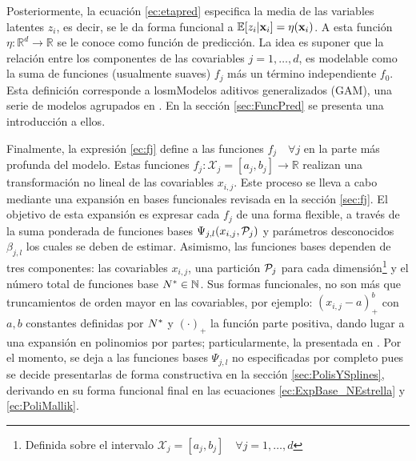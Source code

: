 \documentclass[../Main/Main.tex]{subfiles}
\begin{document}
Posteriormente, la ecuación \eqref{ec:etapred} especifica la media de las variables latentes $z_i$, es decir, se le da forma funcional a $\E[z_i|\xni] = \eta(\xni)$. A esta función $\eta:\mathbb{R}^d\rightarrow\mathbb{R}$ se le conoce como función de predicción. La idea es suponer que la relación entre los componentes de las covariables $j = 1,\ldots,d$, es modelable como la suma de funciones (usualmente suaves) $f_j$ más un término independiente $f_0$. Esta definición corresponde a losmModelos  aditivos generalizados (GAM), una serie de modelos agrupados en \citet{hastie1986generalized}. En la sección \ref{sec:FuncPred} se presenta una introducción a ellos.

Finalmente, la expresión \eqref{ec:fj} define a las funciones $f_j \quad \forall j$ en la parte más profunda del modelo. Estas funciones $f_j: \mathcal{X}_j = [a_j,b_j] \rightarrow \mathbb{R}$ realizan una transformación no lineal de las covariables $x_{i,j}$. Este proceso se lleva a cabo mediante una expansión en bases funcionales revisada en la sección \ref{sec:fj}. El objetivo de esta expansión es expresar cada $f_j$ de una forma flexible, a través de la suma ponderada de funciones bases $\Psi_{j,l}(x_{i,j},\P_j)$ y parámetros desconocidos $\beta_{j,l}$ los cuales se deben de estimar. Asimismo, las funciones bases dependen de tres componentes: las covariables $x_{i,j}$, una partición $\P_j$ para cada dimensión\footnote{Definida sobre el intervalo $\mathcal{X}_j = [a_j, b_j] \quad \forall j = 1,\ldots,d$} y el número total de funciones base $\N\in\mathbb{N}$. Sus formas funcionales, no son más que truncamientos de orden mayor en las covariables, por ejemplo: $(x_{i,j} - a)_+^b$ con $a,b$ constantes definidas por $\N$ y $(\cdot)_+$ la función parte positiva, dando lugar a una expansión en  
polinomios por partes; particularmente, la presentada en \citet{mallik1998automatic}. Por el momento, se deja a las funciones bases $\Psi_{j,l}$ no especificadas por completo pues se decide presentarlas de forma constructiva en la sección \ref{sec:PolisYSplines}, derivando en su forma funcional final en las ecuaciones \eqref{ec:ExpBase_NEstrella} y \eqref{ec:PoliMallik}.
\end{document}
